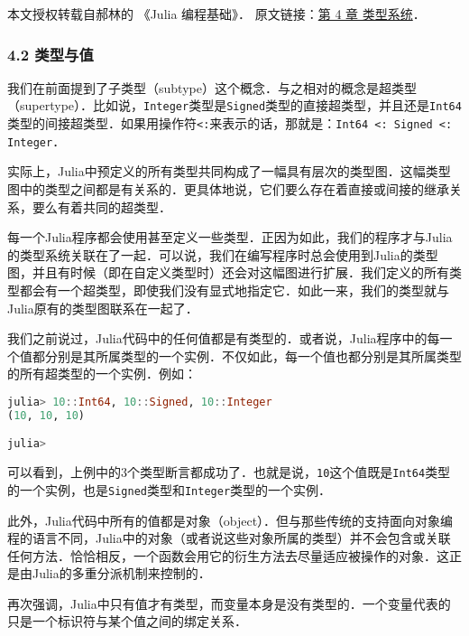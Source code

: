 
本文授权转载自郝林的 《Julia 编程基础》． 原文链接：\href{https://github.com/hyper0x/JuliaBasics/blob/master/book/ch04.md}{第 4 章 类型系统}．


\subsubsection{4.2 类型与值}

我们在前面提到了子类型（subtype）这个概念．与之相对的概念是超类型（supertype）．比如说，\verb|Integer|类型是\verb|Signed|类型的直接超类型，并且还是\verb|Int64|类型的间接超类型．如果用操作符\verb|<:|来表示的话，那就是：\verb|Int64 <: Signed <: Integer|．

实际上，Julia中预定义的所有类型共同构成了一幅具有层次的类型图．这幅类型图中的类型之间都是有关系的．更具体地说，它们要么存在着直接或间接的继承关系，要么有着共同的超类型．

每一个Julia程序都会使用甚至定义一些类型．正因为如此，我们的程序才与Julia的类型系统关联在了一起．可以说，我们在编写程序时总会使用到Julia的类型图，并且有时候（即在自定义类型时）还会对这幅图进行扩展．我们定义的所有类型都会有一个超类型，即使我们没有显式地指定它．如此一来，我们的类型就与Julia原有的类型图联系在一起了．

我们之前说过，Julia代码中的任何值都是有类型的．或者说，Julia程序中的每一个值都分别是其所属类型的一个实例．不仅如此，每一个值也都分别是其所属类型的所有超类型的一个实例．例如：

\begin{lstlisting}[language=julia]
julia> 10::Int64, 10::Signed, 10::Integer
(10, 10, 10)

julia> 
\end{lstlisting}

可以看到，上例中的3个类型断言都成功了．也就是说，\verb|10|这个值既是\verb|Int64|类型的一个实例，也是\verb|Signed|类型和\verb|Integer|类型的一个实例．

此外，Julia代码中所有的值都是对象（object）．但与那些传统的支持面向对象编程的语言不同，Julia中的对象（或者说这些对象所属的类型）并不会包含或关联任何方法．恰恰相反，一个函数会用它的衍生方法去尽量适应被操作的对象．这正是由Julia的多重分派机制来控制的．

再次强调，Julia中只有值才有类型，而变量本身是没有类型的．一个变量代表的只是一个标识符与某个值之间的绑定关系．